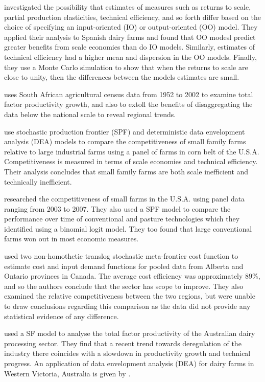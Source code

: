 \documentclass[12pt]{report}
\begin{document}
\citet{kumbhakar08a} investigated the possibility that estimates of measures such as returns to scale, partial production elasticities, technical efficiency, and so forth differ based on the choice of specifying an input-oriented (IO) or output-oriented (OO) model. They applied their analysis to Spanish dairy farms and found that OO modesl predict greater benefits from scale economies than do IO models. Similarly, estimates of technical efficiency had a higher mean and dispersion in the OO models. Finally, they use a Monte Carlo simulation to show that when the returns to scale are close to unity, then the differences between the models estimates are small. 

\citet{conradie09} uses South African agricultural census data from 1952 to 2002 to examine total factor productivity growth, and also to extoll the benefits of disaggregating the data below the national scale to reveal regional trends.

\citet{paul04} use stochastic production frontier (SPF) and deterministic data envelopment analysis (DEA) models to compare the competitiveness of small family farms relative to large industrial farms using a panel of farms in corn belt of the U.S.A. Competitiveness is measured in terms of scale economies and technical efficiency. Their analysis concludes that small family farms are both scale inefficient and technically inefficient.

\citet{nehring09} researched the competitiveness of small farms in the U.S.A. using panel data ranging from 2003 to 2007. They also used a SPF model to compare the performance over time of conventional and pasture technologies which they identified using a binomial logit model. They too found that large conventional farms won out in most economic measures. 

\citet{hailu05} used two non-homothetic translog stochastic meta-frontier cost function to estimate cost and input demand functions for pooled data from Alberta and Ontario provinces in Canada. The average cost efficiency was approximately 89\%, and so the authors conclude that the sector has scope to improve. They also examined the relative competitiveness between the two regions, but were unable to draw conclusions regarding this comparison as the data did not provide any statistical evidence of any difference. 

\citet{douc00} used a SF model to analyse the total factor productivity of the Australian dairy processing sector. They find that a recent trend towards deregulation of the industry there coincides with a slowdown in productivity growth and technical progress. An application of data envelopment analysis (DEA) for dairy farms in Western Victoria, Australia is given by \citet{carter10}. 
\end{document}
